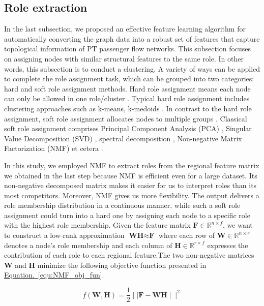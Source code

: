 \documentclass[a4paper,fleqn]{cas-sc}
\begin{document}
\subsection{Role extraction}
In the last subsection, we proposed an effective feature learning algorithm for automatically converting the graph data into a robust set of features that capture topological information of PT passenger flow networks. This subsection focuses on assigning nodes with similar structural features to the same role. In other words, this subsection is to conduct a clustering.  A variety of ways can be applied to complete the role assignment task, which can be grouped into two categories: hard and soft role assignment methods. Hard role assignment means each node can only be allowed in one role/cluster \citep{nowicki2001estimation,batagelj2004generalized}. Typical hard role assignment includes clustering approaches such as k-means, k-medoids \citep{zhu2005semi,berkhin2006survey}. In contrast to the hard role assignment, soft role assignment allocates nodes to multiple groups \citep{airoldi2008mixed, fu2009dynamic}. Classical soft role assignment comprises Principal Component Analysis (PCA) , Singular Value Decomposition (SVD) , spectral decomposition , Non-negative Matrix Factorization (NMF) et cetera \citep{wold1987principal,golub1971singular,partyka1999interpretational,lee1999learning}. 

In this study, we employed NMF to extract roles from the regional feature matrix we obtained in the last step because NMF is efficient even for a large dataset. Its non-negative decomposed matrix makes it easier for us to interpret roles than its most competitors. Moreover, NMF gives us more flexibility. The output delivers a role membership distribution in a continuous manner, while such a soft role assignment could turn into a hard one by assigning each node to a specific role with the highest role membership. Given the feature matrix $\textbf{F}\in \mathbb{R}^{n\times f}$, we want to construct a low-rank approximation $\textbf{WH} \approx \textbf{F}$ where each row of $\textbf{
W}\in \mathbb{R}^{n\times r}$ denotes a node's role membership and each column of $\textbf{
H}\in \mathbb{R}^{r\times f}$ expresses the contribution of each role to each regional feature.The two non-negative matrices \textbf{W} and \textbf{H} minimize the following objective function presented in \hyperref[equ:bikesharing_base_feature]{Equation.~\ref{equ:NMF_obj_fun}}.

\begin{equation}
f(\textbf{W},\textbf{H}) = \frac{1}{2}\mid\mid\textbf{F} - \textbf{WH}\mid\mid^{2}
\label{equ:NMF_obj_fun}
\end{equation}
\end{document}
